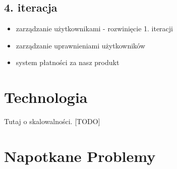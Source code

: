 \documentclass{beamer}
\begin{document}
\subsection{4. iteracja}
  \begin{frame}
    \begin{itemize}
      \item zarządzanie użytkownikami - rozwinięcie 1. iteracji
      \item zarządzanie uprawnieniami użytkowników
      \item system płatności za nasz produkt
    \end{itemize}
  \end{frame}
\section{Technologia}
  \begin{frame}
    \begin{block}{}
      Tutaj  o skalowalności.
      [TODO]
    \end{block}
  \end{frame}
\section{Napotkane Problemy}
\end{document}
